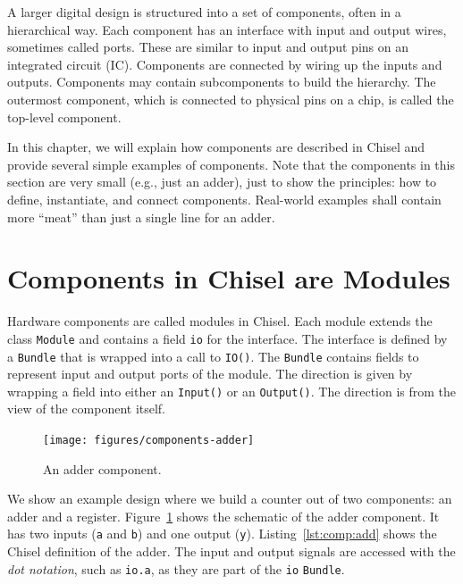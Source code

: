 \documentclass[%
    10pt,
    headinclude, footexclude,
    openright, %
    notitlepage,
    cleardoubleempty,
    headsepline,
    pointlessnumbers,
    bibtotoc, idxtotoc,
    ]{scrbook}
\newcommand{\code}[1]{{\lstinline[basicstyle=\small\ttfamily]{#1}}}
\begin{document}
A larger digital design is structured into a set of components, often in
a hierarchical way. Each component has an interface with input and output
wires, sometimes called ports. These are similar to input and output pins on an integrated circuit (IC).
Components are connected by wiring up the inputs and outputs.
Components may contain subcomponents to build the hierarchy.
The outermost component, which is connected to physical pins
on a chip, is called the top-level component.

In this chapter, we will explain how components are described in Chisel and
provide several simple examples of components.
Note that the components in this section are very small (e.g., just an adder),
just to show the principles: how to define, instantiate, and connect components.
Real-world examples shall contain more ``meat'' than just a single line for
an adder.

\section{Components in Chisel are Modules}


Hardware components are called modules in Chisel. Each module extends
the class \code{Module} and contains a field \code{io} for the interface.
The interface is defined by a \code{Bundle} that is wrapped into a call to \code{IO()}.
The \code{Bundle} contains fields to represent input and output ports of
the module. The direction is given by wrapping a field into either an \code{Input()}
or an \code{Output()}. The direction is from the view of the component itself.


\begin{figure}
  \centering
  \texttt{[image: figures/components-adder]}
  \caption{An adder component.}
  \label{fig:components-adder}
\end{figure}


We show an example design where we build a counter out of two components:
an adder and a register.
Figure~\ref{fig:components-adder} shows the schematic of the adder component.
It has two inputs (\code{a} and \code{b}) and one output (\code{y}).
Listing~\ref{lst:comp:add} shows the Chisel definition of the adder.
The input and output signals are accessed with
the \emph{dot notation}, such as \code{io.a}, as they are part of the \code{io}
\code{Bundle}.
\end{document}
